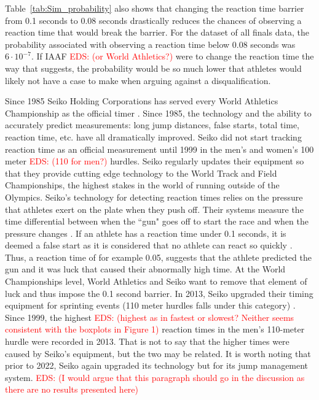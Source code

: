 \documentclass[12pt, letterpaper, titlepage]{article}
\newcommand{\eds}[1]{\textcolor{red}{EDS: (#1)}}
\begin{document}
Table~\ref{tab:Sim_probability} also shows that changing the reaction time 
barrier from 0.1 seconds to 0.08 seconds drastically reduces the chances of 
observing a reaction time that would break the barrier.  For the dataset of all 
finals data, the probability
associated with observing a reaction time below 0.08 seconds was $6\cdot10^{-7}$.
If IAAF \eds{or World Athletics?} were to change the reaction time the way that 
\citet{komi2009iaaf}
suggests, the probability would be so much lower that athletes would likely not
have a case to make when arguing against a disqualification.


Since 1985 Seiko Holding Corporations has served every World Athletics 
Championship as the official timer \citep{wa2022seiko}.  Since 1985, the 
technology and the ability
to accurately predict measurements: long jump distances, false starts, total 
time, reaction time, etc. have all dramatically improved.  Seiko did not start 
tracking reaction time as an official measurement until 1999 in the men's and 
women's 100 meter \eds{110 for men?} hurdles. 
Seiko regularly updates their equipment so that they provide cutting edge
technology to the World Track and Field Championships, the highest stakes in the 
world of running outside of the Olympics. Seiko's technology for detecting 
reaction times relies on the pressure that athletes exert on the plate when they 
push off.  Their systems measure the time differential
between when the ``gun" goes off to start the race and when the pressure changes 
\citep{wa2022seiko}.  If an athlete has a reaction time under 0.1 seconds, it 
is deemed a 
false start as it is considered that no athlete can react so quickly 
\citep{Seiko-Timing}.  Thus, a reaction time of for example 0.05, suggests that 
the athlete predicted the gun and it was luck that caused their abnormally high 
time.  At the World Championships level, World Athletics and Seiko want to remove 
that element of luck and thus impose the 0.1 second barrier. In 2013, Seiko 
upgraded their timing equipment for sprinting events (110 meter hurdles falls 
under this category) \citep{wa2013backtage}. Since 1999, the
 highest \eds{highest as in fastest or slowest? Neither seems consistent with 
the boxplots in Figure 1} reaction 
times in the men's 110-meter hurdle were recorded in 2013.  That is not to say
 that the higher 
times were caused by Seiko's equipment, but the two may be related.  It is worth 
noting that prior
to 2022, Seiko again upgraded its technology but for its jump management system.
\eds{I would argue that this paragraph should go in the discussion as there are 
no results presented here}
\end{document}
